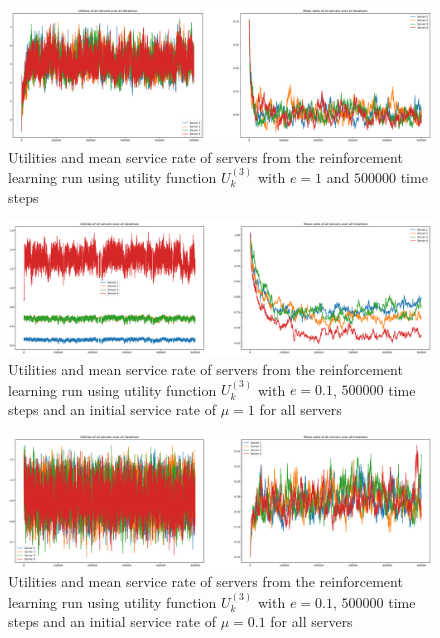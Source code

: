 \begin{figure}[H]
    \includegraphics[width=\textwidth]{chapters/00_appendix/03_more_rl_results/Bin/utility_3_eps/u3_2_e1.eps}
    \caption{Utilities and mean service rate of servers from the reinforcement
    learning run using utility function \(U_k^{(3)}\) with \(e = 1\) and
    \(500000\) time steps}
    \label{fig:RL_utility3_2_e1}
\end{figure}

\begin{figure}[H]
    \includegraphics[width=\textwidth]{chapters/00_appendix/03_more_rl_results/Bin/utility_3_eps/u3_3_initial_1.eps}
    \caption{Utilities and mean service rate of servers from the reinforcement
    learning run using utility function \(U_k^{(3)}\) with \(e = 0.1\),
    \(500000\) time steps and an initial service rate of \(\mu = 1\) for all
    servers}
    \label{fig:RL_utility3_3_initial_1}
\end{figure}

\begin{figure}[H]
    \includegraphics[width=\textwidth]{chapters/00_appendix/03_more_rl_results/Bin/utility_3_eps/u3_3_initial_01.eps}
    \caption{Utilities and mean service rate of servers from the reinforcement
    learning run using utility function \(U_k^{(3)}\) with \(e = 0.1\),
    \(500000\) time steps and an initial service rate of \(\mu = 0.1\) for all
    servers}
    \label{fig:RL_utility3_3_initial_01}
\end{figure}

